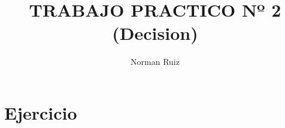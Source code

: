 \documentclass[12pt,a4paper,twoside]{article}
\author{Norman Ruiz}
\title{TRABAJO PRACTICO \linebreak Nº 2 \linebreak (Decision)}
\begin{document}
\maketitle
\newpage

\tableofcontents
\newpage

\section{Ejercicio }

\hspace*{1cm}

\newpage
\end{document}
